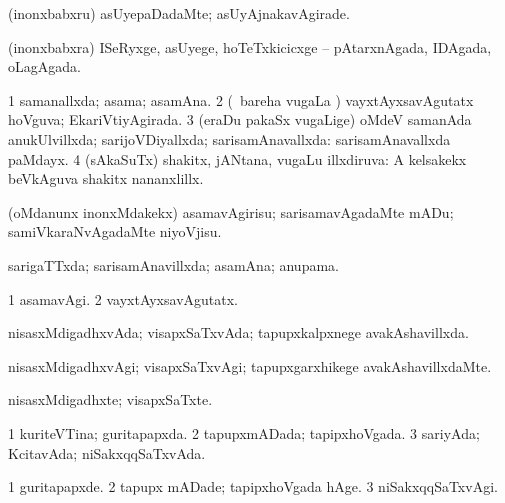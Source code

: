 {\bentry
{} 
\gl{\kirxvi}
\expl{}
\bmng
(inonxbabxru) asUyepaDadaMte; asUyAjnakavAgirade. 
\emng
\eentry

\bentry
{} 
\gl{\gu}
\bmng
 (inonxbabxra) ISeRyxge, asUyege, hoTeTxkicicxge -- pAtarxnAgada, IDAgada, oLagAgada. 
\emng
\eentry

\bentry
{} 
\gl{\gu}
\bmng
\bnum
\num{1} samanallxda; asama; asamAna. 
\num{2} (\kanmu\ bareha \mo vugaLa \vi) vayxtAyxsavAgutatx hoVguva; EkariVtiyAgirada. 
\num{3} (eraDu pakaSx \mo vugaLige) oMdeV samanAda anukUlvillxda; sarijoVDiyallxda; sarisamAnavallxda:  sarisamAnavallxda paMdayx. 
\num{4} (sAkaSuTx) shakitx, jANtana, \mo vugaLu illxdiruva:  A kelsakekx beVkAguva shakitx nananxlillx. 
\enum
\emng
\eentry

\bentry
{} 
\gl{\sakirx}
\expl{}
\bmng
\emng
\eentry

\bentry
{} 
\gl{\sakirx}
\expl{}
\bmng
 (oMdanunx inonxMdakekx) asamavAgirisu; sarisamavAgadaMte mADu; samiVkaraNvAgadaMte niyoVjisu. 
\emng
\eentry

\bentry
{} 
\gl{\gu}
\expl{}
\bmng
 sarigaTTxda; sarisamAnavillxda; asamAna; anupama. 
\emng
\eentry

\bentry
{} 
\gl{\kirxvi}
\expl{}
\bmng
\bnum
\num{1} asamavAgi. 
\num{2} vayxtAyxsavAgutatx. 
\enum
\emng
\eentry

\bentry
{} 
\gl{\gu}
\expl{}
\bmng
 nisasxMdigadhxvAda; visapxSaTxvAda; tapupxkalpxnege avakAshavillxda. 
\emng
\eentry

\bentry
{} 
\gl{\kirxvi}
\expl{}
\bmng
 nisasxMdigadhxvAgi; visapxSaTxvAgi; tapupxgarxhikege avakAshavillxdaMte. 
\emng
\eentry

\bentry
{} 
\gl{\nA}
\expl{}
\bmng
 nisasxMdigadhxte; visapxSaTxte. 
\emng
\eentry

\bentry
{} 
\gl{\gu}
\bmng
\bnum
\num{1} kuriteVTina; guritapapxda. 
\num{2} tapupxmADada; tapipxhoVgada. 
\num{3} sariyAda; KcitavAda; niSakxqqSaTxvAda. 
\enum
\emng
\eentry

\bentry
{} 
\gl{\kirxvi}
\expl{}
\bmng
\bnum
\num{1} guritapapxde. 
\num{2} tapupx mADade; tapipxhoVgada hAge. 
\num{3} niSakxqqSaTxvAgi. 
\enum
\emng
\eentry

}
